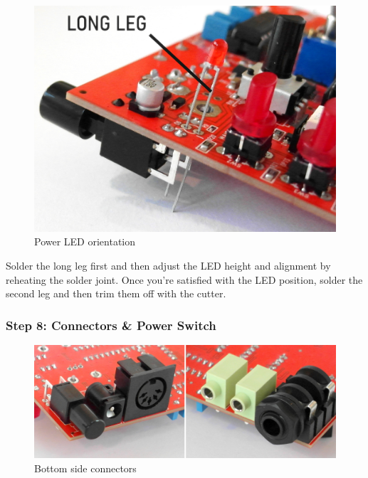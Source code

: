 \documentclass{scrartcl}
\begin{document}
\vspace{0.50cm}
\begin{figure}[!ht]
    \begin{center}
        \includegraphics[scale=0.35]{assets/pcb-led.jpg}
        \caption{Power LED orientation}
    \end{center}
\end{figure}

Solder the long leg first and then adjust the LED height and alignment by reheating the solder joint.
Once you're satisfied with the LED position, solder the second leg and then trim them off with the cutter.

\subsubsection{Step 8: Connectors \& Power Switch}

\begin{figure}[!ht]
    \begin{center}
        \includegraphics[scale=0.32]{assets/pcb-connectors.jpg}
        \caption{Bottom side connectors}
    \end{center}
\end{figure}
\end{document}
